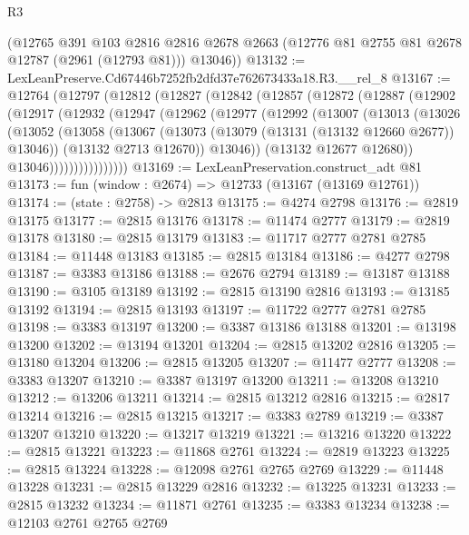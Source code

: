 \begin{lexlean}{R3}
\begin{coremodule}
      (@12765
        @391
        @103
        @2816
        @2816
        @2678
        @2663
        (@12776 @81 @2755 @81 @2678 @12787 (@2961 (@12793 @81)))
        @13046))
@13132 := LexLeanPreserve.Cd67446b7252fb2dfd37e762673433a18.R3.__rel_8
@13167 := @12764
    (@12797
      (@12812
        (@12827
          (@12842
            (@12857
              (@12872
                (@12887
                  (@12902
                    (@12917
                      (@12932
                        (@12947
                          (@12962
                            (@12977
                              (@12992
                                (@13007
                                  (@13013
                                    (@13026
                                      (@13052
                                        (@13058
                                          (@13067
                                            (@13073 (@13079 (@13131 (@13132 @12660 @2677)) @13046))
                                            (@13132 @2713 @12670))
                                          @13046))
                                      (@13132 @12677 @12680))
                                    @13046))))))))))))))))
@13169 := LexLeanPreservation.construct_adt @81
@13173 := fun (window : @2674) => @12733 (@13167 (@13169 @12761))
@13174 := (state : @2758) -> @2813
@13175 := @4274 @2798
@13176 := @2819 @13175
@13177 := @2815 @13176
@13178 := @11474 @2777
@13179 := @2819 @13178
@13180 := @2815 @13179
@13183 := @11717 @2777 @2781 @2785
@13184 := @11448 @13183
@13185 := @2815 @13184
@13186 := @4277 @2798
@13187 := @3383 @13186
@13188 := @2676 @2794
@13189 := @13187 @13188
@13190 := @3105 @13189
@13192 := @2815 @13190 @2816
@13193 := @13185 @13192
@13194 := @2815 @13193
@13197 := @11722 @2777 @2781 @2785
@13198 := @3383 @13197
@13200 := @3387 @13186 @13188
@13201 := @13198 @13200
@13202 := @13194 @13201
@13204 := @2815 @13202 @2816
@13205 := @13180 @13204
@13206 := @2815 @13205
@13207 := @11477 @2777
@13208 := @3383 @13207
@13210 := @3387 @13197 @13200
@13211 := @13208 @13210
@13212 := @13206 @13211
@13214 := @2815 @13212 @2816
@13215 := @2817 @13214
@13216 := @2815 @13215
@13217 := @3383 @2789
@13219 := @3387 @13207 @13210
@13220 := @13217 @13219
@13221 := @13216 @13220
@13222 := @2815 @13221
@13223 := @11868 @2761
@13224 := @2819 @13223
@13225 := @2815 @13224
@13228 := @12098 @2761 @2765 @2769
@13229 := @11448 @13228
@13231 := @2815 @13229 @2816
@13232 := @13225 @13231
@13233 := @2815 @13232
@13234 := @11871 @2761
@13235 := @3383 @13234
@13238 := @12103 @2761 @2765 @2769

\end{coremodule}
\end{lexlean}
